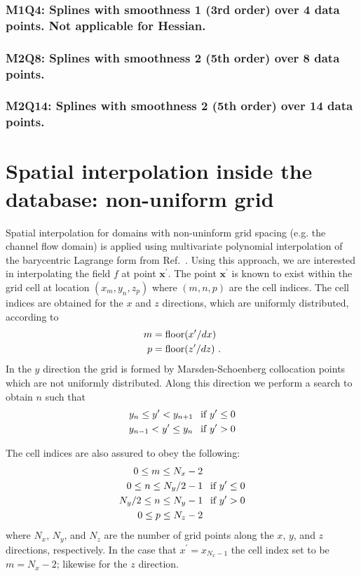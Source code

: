 \documentclass[11pt]{article}
\begin{document}
\subsubsection*{M1Q4: Splines with smoothness 1 (3rd order) over 4 data points. Not applicable for Hessian.}
\subsubsection*{M2Q8: Splines with smoothness 2 (5th order) over 8 data points.}
\subsubsection*{M2Q14: Splines with smoothness 2 (5th order) over 14 data points.}

\section{Spatial interpolation inside the database: non-uniform grid}\label{sec:interp}
Spatial interpolation for domains with non-uninform grid spacing (e.g. the
channel flow domain) is applied using multivariate polynomial interpolation of
the barycentric Lagrange form from Ref.~\cite{Berrut2004}. Using this approach,
we are interested in interpolating the field $f$ at point $\bm{x}^\prime$. The
point $\bm{x}^\prime$ is known to exist within the grid cell at location
$(x_m,y_n,z_p)$ where $(m,n,p)$ are the cell indices. The cell indices are
obtained for the $x$ and $z$ directions, which are uniformly distributed,
according to
\begin{align}
  m &= \text{floor}( x^\prime / dx ) \\
  p &= \text{floor}( z^\prime / dz ) \mbox{ .} \notag
\end{align}
In the $y$ direction the grid is formed by Marsden-Schoenberg collocation points
which are not uniformly distributed. Along this direction we perform a search to obtain $n$ such that 
\begin{align}
  y_n  \leq y^\prime < y_{n+1} &\text{\hspace{1ex} if } y^\prime \leq 0 \\
  y_{n-1} < y^\prime \leq y_n &\text{\hspace{1ex} if } y^\prime > 0 \notag
\end{align}

The cell indices are also assured to obey the following:
\begin{align}
  0 \leq m \leq N_x - 2 & \notag \\
  0 \leq n \leq N_y/2 - 1 &\text{\hspace{1ex} if } y^\prime \leq 0 \\
  N_y/2 \leq n \leq N_y - 1 &\text{\hspace{1ex} if } y^\prime > 0 \notag \\
  0 \leq p \leq N_z - 2 &\notag
\end{align}
where $N_x$, $N_y$, and $N_z$ are the number of grid points along the $x$, $y$, and
$z$ directions, respectively. In the case that $x^\prime = x_{N_x-1}$ the cell index set to be $m=N_x-2$; likewise for the $z$ direction.
 
\end{document}
